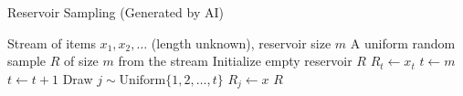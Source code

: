 \begin{algorithm}[H]
    \begin{addedenv}
    \caption{Reservoir Sampling (Generated by AI)}
    \label{algo:reservoir}
    \begin{algorithmic}[1]
      \Require Stream of items $x_1, x_2, \ldots$ (length unknown), reservoir size $m$
      \Ensure A uniform random sample $R$ of size $m$ from the stream
      \State Initialize empty reservoir $R$
        \State $R_t \gets x_t$ 
      \EndFor
      \State $t \gets m$
        \State $t \gets t + 1$
        \State Draw $j \sim \mathrm{Uniform}\{1,2,\ldots,t\}$
          \State $R_j \gets x$ 
        \EndIf
      \EndWhile
      \State \Return $R$
    \end{algorithmic}
    \end{addedenv}
  \end{algorithm}
  